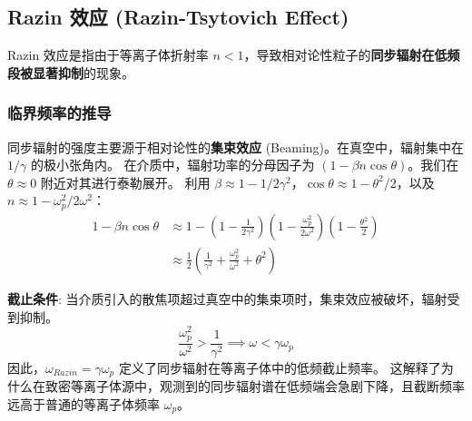 \subsection{Razin 效应 (Razin-Tsytovich Effect)}

Razin 效应是指由于等离子体折射率 $n < 1$，导致相对论性粒子的\textbf{同步辐射在低频段被显著抑制}的现象。

\subsubsection{临界频率的推导}

同步辐射的强度主要源于相对论性的\textbf{集束效应} (Beaming)。在真空中，辐射集中在 $1/\gamma$ 的极小张角内。
在介质中，辐射功率的分母因子为 $(1 - \beta n \cos\theta)$。我们在 $\theta \approx 0$ 附近对其进行泰勒展开。
利用 $\beta \approx 1 - 1/2\gamma^2$，$\cos\theta \approx 1 - \theta^2/2$，以及 $n \approx 1 - \omega_p^2/2\omega^2$：
\begin{align}
    1 - \beta n \cos\theta &\approx 1 - \left(1 - \frac{1}{2\gamma^2}\right) \left(1 - \frac{\omega_p^2}{2\omega^2}\right) \left(1 - \frac{\theta^2}{2}\right) \\
    &\approx \frac{1}{2} \left( \frac{1}{\gamma^2} + \frac{\omega_p^2}{\omega^2} + \theta^2 \right)
\end{align}

\textbf{截止条件}:
当介质引入的散焦项超过真空中的集束项时，集束效应被破坏，辐射受到抑制。
\begin{equation}
    \frac{\omega_p^2}{\omega^2} > \frac{1}{\gamma^2} \implies \omega < \gamma \omega_p
\end{equation}
因此，$\omega_{Razin} = \gamma \omega_p$ 定义了同步辐射在等离子体中的低频截止频率。
这解释了为什么在致密等离子体源中，观测到的同步辐射谱在低频端会急剧下降，且截断频率远高于普通的等离子体频率 $\omega_p$。